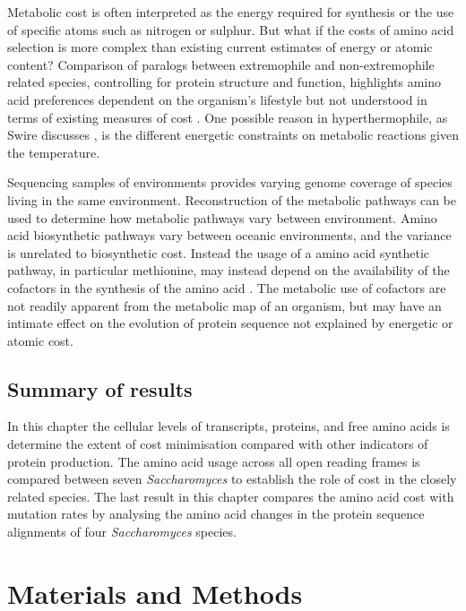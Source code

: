 Metabolic cost is often interpreted as the energy required for synthesis or the use of specific atoms such as nitrogen or sulphur. But what if the costs of amino acid selection is more complex than existing current estimates of energy or atomic content? Comparison of paralogs between extremophile and non-extremophile related species, controlling for protein structure and function, highlights amino acid preferences dependent on the organism's lifestyle but not understood in terms of existing measures of cost \cite{Goodarzi2007}. One possible reason in hyperthermophile, as Swire discusses \cite{swire2007}, is the different energetic constraints on metabolic reactions given the temperature.

Sequencing samples of environments provides varying genome coverage of species living in the same environment. Reconstruction of the metabolic pathways can be used to determine how metabolic pathways vary between environment. Amino acid biosynthetic pathways vary between oceanic environments, and the variance is unrelated to biosynthetic cost. Instead the usage of a amino acid synthetic pathway, in particular methionine, may instead depend on the availability of the cofactors in the synthesis of the amino acid \cite{gianoulis2009}. The metabolic use of cofactors are not readily apparent from the metabolic map of an organism, but may have an intimate effect on the evolution of protein sequence not explained by energetic or atomic cost.

\subsection{Summary of results}

In this chapter the cellular levels of transcripts, proteins, and free amino acids is determine the extent of cost minimisation compared with other indicators of protein production. The amino acid usage across all open reading frames is compared between seven \emph{Saccharomyces} to establish the role of cost in the closely related species. The last result in this chapter compares the amino acid cost with mutation rates by analysing the amino acid changes in the protein sequence alignments of four \emph{Saccharomyces} species.

\clearpage

\section{Materials and Methods}

